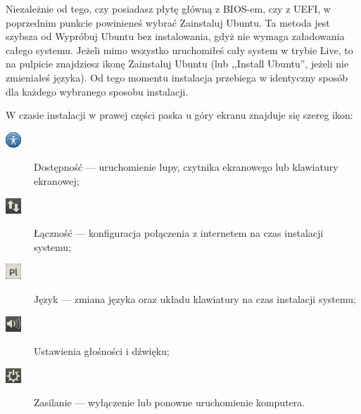 Niezależnie od tego, czy posiadasz płytę główną z BIOS-em, czy z UEFI, w poprzednim punkcie powinieneś wybrać \textcolor{ubuntu_orange}{Zainstaluj Ubuntu}. Ta metoda jest szybsza od \textcolor{ubuntu_orange}{Wypróbuj Ubuntu bez instalowania}, gdyż nie wymaga załadowania całego systemu. Jeżeli mimo wszystko uruchomiłeś cały system w trybie Live, to na pulpicie znajdziesz ikonę \textcolor{ubuntu_orange}{Zainstaluj Ubuntu} (lub ,,Install Ubuntu'', jeżeli nie zmieniałeś języka). Od tego momentu instalacja przebiega w identyczny sposób dla każdego wybranego sposobu instalacji.

W czasie instalacji w prawej części paska u góry ekranu znajduje się szereg ikon:
\begin{description}
\item[\includegraphics{images/ikony_dostempnosc.png}]\textcolor{ubuntu_orange}{Dostępność} --- uruchomienie lupy, czytnika ekranowego lub klawiatury ekranowej;
\item[\includegraphics{images/ikony_internet.png}]\textcolor{ubuntu_orange}{Łączność} --- konfiguracja połączenia z internetem na czas instalacji systemu;
\item[\includegraphics{images/ikony_jezyk.png}]\textcolor{ubuntu_orange}{Język} --- zmiana języka oraz układu klawiatury na czas instalacji systemu;
\item[\includegraphics{images/ikony_dzwiek.png}]\textcolor{ubuntu_orange}{Ustawienia głośności i dźwięku};
\item[\includegraphics{images/ikony_zasilanie.png}]\textcolor{ubuntu_orange}{Zasilanie} --- wyłączenie lub ponowne uruchomienie komputera.
\end{description}
\clearpage
